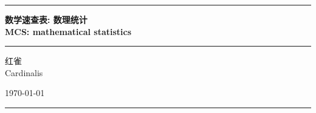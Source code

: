\begin{titlepage}
	\centering
	\rule{\textwidth}{1pt}

	\vspace{0.15\textheight}

	{\Huge \bfseries 数学速查表: 数理统计\\\vspace{1ex}MCS: mathematical statistics}

	\vspace{0.025\textheight}

	\rule{0.8\textwidth}{0.4pt}

	\vspace{0.1\textheight}

	{\Large 红雀\\\vspace{1ex}Cardinalis}

	\vfill

	{\large \today}

	\vspace{0.1\textheight}

	\rule{\textwidth}{1pt}
\end{titlepage}